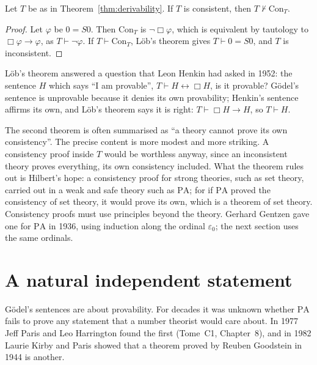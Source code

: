 \begin{theorem}\label{thm:second}
Let $T$ be as in Theorem~\ref{thm:derivability}. If $T$ is consistent, then $T\nvdash\mathrm{Con}_T$.
\end{theorem}

\begin{proof}
Let $\varphi$ be $0=S0$. Then $\mathrm{Con}_T$ is $\neg\Box\varphi$, which is equivalent by tautology to $\Box\varphi\to\varphi$, as $T\vdash\neg\varphi$. If $T\vdash\mathrm{Con}_T$, Löb's theorem gives $T\vdash0=S0$, and $T$ is inconsistent.
\end{proof}

Löb's theorem answered a question that Leon Henkin had asked in 1952: the sentence $H$ which says ``I am provable'', $T\vdash H\leftrightarrow\Box H$, is it provable? Gödel's sentence is unprovable because it denies its own provability; Henkin's sentence affirms its own, and Löb's theorem says it is right: $T\vdash\Box H\to H$, so $T\vdash H$.

The second theorem is often summarised as ``a theory cannot prove its own consistency''. The precise content is more modest and more striking. A consistency proof inside $T$ would be worthless anyway, since an inconsistent theory proves everything, its own consistency included. What the theorem rules out is Hilbert's hope: a consistency proof for strong theories, such as set theory, carried out in a weak and safe theory such as $\mathrm{PA}$; for if $\mathrm{PA}$ proved the consistency of set theory, it would prove its own, which is a theorem of set theory. Consistency proofs must use principles beyond the theory. Gerhard Gentzen gave one for $\mathrm{PA}$ in 1936, using induction along the ordinal $\varepsilon_0$; the next section uses the same ordinals.

\section{A natural independent statement}\label{sec:goodstein}

Gödel's sentences are about provability. For decades it was unknown whether $\mathrm{PA}$ fails to prove any statement that a number theorist would care about. In 1977 Jeff Paris and Leo Harrington found the first (Tome~C1, Chapter~8), and in 1982 Laurie Kirby and Paris showed that a theorem proved by Reuben Goodstein in 1944 is another.

